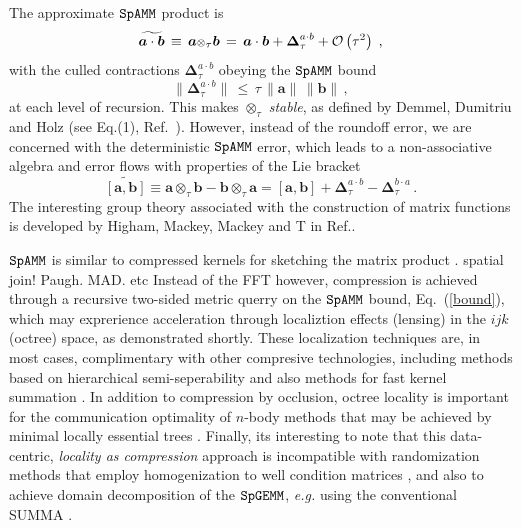 \documentclass[letterpaper,twocolumn,amsmath,amsfont,amssymb,english,aps,jcp,preprintnumbers,groupaddress,nofootinbib,tightenlines]{revtex4}
\newcommand{\mat}[1]{\boldsymbol{#1}}
\newcommand{\ot}{ {\scriptstyle \otimes}_{ \tau } }
\begin{document}
The approximate $\tt SpAMM$ product is 
\begin{equation}
\widetilde{\mat{a}\cdot \mat{b}} \,  \equiv \, \mat{a} \ot \mat{b} \, 
  = \, \mat{a} \cdot \mat{b} + \mat{\Delta}^{a \cdot b}_{\tau} 
+ {\cal{O}} \left(  \tau^2 \right) \; ,
\end{equation}
with the culled contractions $\mat{\Delta}^{a \cdot b}_{\tau}$ obeying the $\tt SpAMM$ bound 
\begin{equation}\label{bound}
\lVert \mat{\Delta}^{a \cdot b}_{\tau} \rVert \, \leq \, \tau \, \lVert \mat{a} \rVert  \,  \lVert \mat{b} \rVert \, , 
\end{equation}
at each level of recursion.  This makes $\ot$ {\em stable}, as defined by Demmel, Dumitriu and Holz (see Eq.(1), Ref.~\cite{Demmel07}). 
However, instead of the roundoff error, we are concerned with the deterministic $\tt SpAMM$ error,  which 
leads to a non-associative algebra and error flows with properties of the Lie bracket
\begin{equation}
\widetilde{\left[ \mat{a} , \mat{b} \right]} \equiv \mat{a} \ot \mat{b}-\mat{b} \ot \mat{a}  
=  \left[ \mat{a} , \mat{b} \right]
+ \mat{\Delta}^{a\cdot b}_{\tau} -\mat{\Delta}^{b\cdot a}_{\tau} \,.
\end{equation}
The interesting group theory associated with the construction of matrix functions is developed by Higham, Mackey, Mackey and T 
in Ref.\cite{}.  

$\tt SpAMM$ is similar to compressed kernels for sketching the matrix product \cite{Kutzkov2012, Pagh2013}. 
spatial join! Paugh.  MAD.  etc
 Instead of
the FFT however, compression is achieved through a recursive two-sided metric querry on the $\tt SpAMM$ bound, Eq.~(\ref{bound}),
which may exprerience acceleration through localiztion effects (lensing) in the $ijk$ (octree) space, as demonstrated shortly. 
These localization techniques are, in most cases, complimentary with other compresive technologies, including methods based on 
hierarchical semi-seperability and also methods for fast kernel summation \cite{}. 
In addition to compression by occlusion, octree locality is important for the communication optimality of 
$n$-body methods \cite{Warren Salmon, Yellik} that may be achieved by minimal locally essential trees \cite{}.    
Finally, its interesting to note that this data-centric, {\em locality as compression} approach is incompatible with 
randomization methods that employ homogenization to well condition matrices 
\cite{pan, DiahLi and Parket Scott},  and also to achieve domain decomposition of the $\tt SpGEMM$, {\em e.g.} 
using the conventional SUMMA \cite{}.
\end{document}

